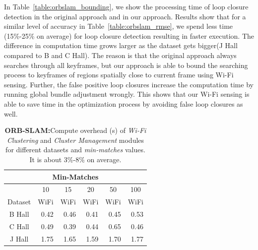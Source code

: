 In Table~\ref{table:orbslam_bounding}, we show the processing time of loop closure detection in the original approach and in our approach. 
Results show that for a similar level of accuracy in Table~\ref{table:orbslam_rmse}, we spend less time (15\%-25\% on average) for loop closure detection resulting in faster execution.
The difference in computation time grows larger as the dataset gets bigger(J Hall compared to B and C Hall). 
The reason is that the original approach always searches through all keyframes, but our approach is able to bound the searching process to keyframes of regions spatially close to current frame using Wi-Fi sensing. 
Further, the false positive loop closures increase the computation time by running global bundle adjustment wrongly. 
This shows that our Wi-Fi sensing is able to save time in the optimization process by avoiding false loop closures as well.  
\begin{table}[t]
\caption{{\bf ORB-SLAM:}Compute overhead (s) of {\it Wi-Fi Clustering} and {\it Cluster Management} modules for different datasets and {\it min-matches} values. It is about 3\%-8\% on average. }
\begin{center}
\begin{tabular}{| c | r | r | r | r | r |} 
\hline 
\multicolumn{6}{|c|}{{Min-Matches}} \\ 
\hline 
 & \multicolumn{1}{|c|}{10} & \multicolumn{1}{|c|}{15} & \multicolumn{1}{|c|}{20} & \multicolumn{1}{|c|}{50} & \multicolumn{1}{|c|}{100} \\ 
\hline 
{Dataset} & \multicolumn{1}{|c|}{WiFi} & \multicolumn{1}{|c|}{WiFi} & \multicolumn{1}{|c|}{WiFi} & \multicolumn{1}{|c|}{WiFi} & \multicolumn{1}{|c|}{WiFi} \\ 
\hline 
 B Hall & 0.42 & 0.46 & 0.41 & 0.45 & 0.53 \\ 
 C Hall & 0.49 & 0.39 & 0.44 & 0.65 & 0.46 \\ 
 J Hall & 1.75 & 1.65 & 1.59 & 1.70 & 1.77 \\ 
\hline 
\end{tabular} 
\label{table:orbslam_overhead}
\end{center}
\end{table}

